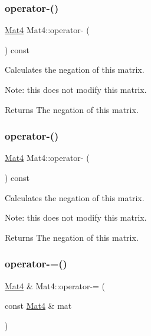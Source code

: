 \subsubsection{\texorpdfstring{operator-\/()}{operator-()}\hspace{0.1cm}{\footnotesize\ttfamily [3/4]}}
{\footnotesize\ttfamily \hyperlink{classMat4}{Mat4} Mat4\+::operator-\/ (\begin{DoxyParamCaption}{ }\end{DoxyParamCaption}) const\hspace{0.3cm}{\ttfamily [inline]}}

Calculates the negation of this matrix.

Note\+: this does not modify this matrix.

\begin{DoxyReturn}{Returns}
The negation of this matrix. 
\end{DoxyReturn}
\mbox{\label{classMat4_a23ddc905ed3d3400c62cb6f60f8577e2}} 
\subsubsection{\texorpdfstring{operator-\/()}{operator-()}\hspace{0.1cm}{\footnotesize\ttfamily [4/4]}}
{\footnotesize\ttfamily \hyperlink{classMat4}{Mat4} Mat4\+::operator-\/ (\begin{DoxyParamCaption}{ }\end{DoxyParamCaption}) const\hspace{0.3cm}{\ttfamily [inline]}}

Calculates the negation of this matrix.

Note\+: this does not modify this matrix.

\begin{DoxyReturn}{Returns}
The negation of this matrix. 
\end{DoxyReturn}
\mbox{\label{classMat4_ae6b419586fa52b27404626c38d78dbdb}} 
\subsubsection{\texorpdfstring{operator-\/=()}{operator-=()}\hspace{0.1cm}{\footnotesize\ttfamily [1/2]}}
{\footnotesize\ttfamily \hyperlink{classMat4}{Mat4} \& Mat4\+::operator-\/= (\begin{DoxyParamCaption}\item[{const \hyperlink{classMat4}{Mat4} \&}]{mat }\end{DoxyParamCaption})\hspace{0.3cm}{\ttfamily [inline]}}

